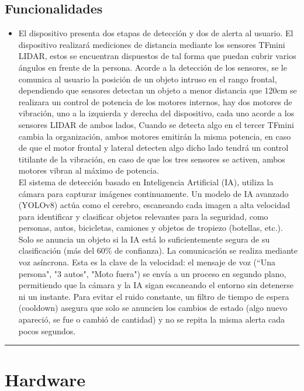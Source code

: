 \documentclass[12pt,a4paper]{article}
\newcommand{\separador}{\vspace{0.5cm}\noindent\rule{\linewidth}{0.5pt}\vspace{0.5cm}}
\begin{document}
\subsection{Funcionalidades}
\begin{itemize}
    \item El dispositivo presenta dos etapas de detección y dos de alerta al usuario. 
    El dispositivo realizará mediciones de distancia mediante los sensores TFmini LIDAR, estos se encuentran dispuestos de tal forma que puedan cubrir varios ángulos en frente de la persona. Acorde a la detección de los sensores, se le comunica al usuario la posición de un objeto intruso en el rango frontal, dependiendo que sensores detectan un objeto a menor distancia que 120cm se realizara un control de potencia de los motores internos, hay dos motores de vibración, uno a la izquierda y derecha del dispositivo, cada uno acorde a los sensores LIDAR de ambos lados, Cuando se detecta algo en el tercer TFmini cambia la organización, ambos motores emitirán la misma potencia, en caso de que el motor frontal y lateral detecten algo dicho lado tendrá un control titilante de la vibración, en caso de que los tres sensores se activen, ambos motores vibran al máximo de potencia.\\
    El sistema de detección basado en Inteligencia Artificial (IA), utiliza la cámara para capturar imágenes continuamente. Un modelo de IA avanzado (YOLOv8) actúa como el cerebro, escaneando cada imagen a alta velocidad para identificar y clasificar objetos relevantes para la seguridad, como personas, autos, bicicletas, camiones y objetos de tropiezo (botellas, etc.). Solo se anuncia un objeto si la IA está lo suficientemente segura de su clasificación (más del 60\% de confianza).
    La comunicación se realiza mediante voz asíncrona. Esta es la clave de la velocidad: el mensaje de voz (``Una persona", "3 autos", "Moto fuera") se envía a un proceso en segundo plano, permitiendo que la cámara y la IA sigan escaneando el entorno sin detenerse ni un instante. Para evitar el ruido constante, un filtro de tiempo de espera (cooldown) asegura que solo se anuncien los cambios de estado (algo nuevo apareció, se fue o cambió de cantidad) y no se repita la misma alerta cada pocos segundos.
    
\end{itemize}

\separador

\section{Hardware}
\end{document}
